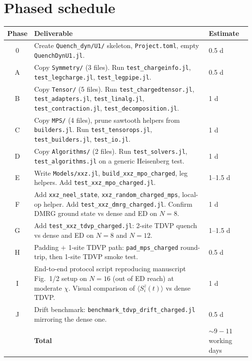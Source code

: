\documentclass[11pt]{article}
\begin{document}
\section{Phased schedule}

\begin{center}
\renewcommand{\arraystretch}{1.15}
\begin{tabularx}{\linewidth}{c X l}
\toprule
Phase & Deliverable & Estimate \\
\midrule
0 & Create \texttt{Quench\_dyn/U1/} skeleton, \texttt{Project.toml}, empty \texttt{QuenchDynU1.jl}. & 0.5 d \\
A & Copy \texttt{Symmetry/} (3 files).  Run \texttt{test\_chargeinfo.jl}, \texttt{test\_legcharge.jl}, \texttt{test\_legpipe.jl}. & 0.5 d \\
B & Copy \texttt{Tensor/} (5 files).  Run \texttt{test\_chargedtensor.jl}, \texttt{test\_adapters.jl}, \texttt{test\_linalg.jl}, \texttt{test\_contraction.jl}, \texttt{test\_decomposition.jl}. & 1 d \\
C & Copy \texttt{MPS/} (4 files), prune sawtooth helpers from \texttt{builders.jl}.  Run \texttt{test\_tensorops.jl}, \texttt{test\_builders.jl}, \texttt{test\_io.jl}. & 1 d \\
D & Copy \texttt{Algorithms/} (2 files).  Run \texttt{test\_solvers.jl}, \texttt{test\_algorithms.jl} on a generic Heisenberg test. & 1 d \\
E & Write \texttt{Models/xxz.jl}, \texttt{build\_xxz\_mpo\_charged}, leg helpers. Add \texttt{test\_xxz\_mpo\_charged.jl}. & 1--1.5 d \\
F & Add \texttt{xxz\_neel\_state}, \texttt{xxz\_random\_charged\_mps}, local-op helper.  Add \texttt{test\_xxz\_dmrg\_charged.jl}.  Confirm DMRG ground state vs dense and ED on $N=8$. & 1 d \\
G & Add \texttt{test\_xxz\_tdvp\_charged.jl}: 2-site TDVP quench vs dense and ED on $N=8$ and $N=12$. & 1--1.5 d \\
H & Padding $+$ 1-site TDVP path: \texttt{pad\_mps\_charged} round-trip, then 1-site TDVP smoke test. & 0.5 d \\
I & End-to-end protocol script reproducing manuscript Fig.~1/2 setup on $N=16$ (out of ED reach) at moderate $\chi$.  Visual comparison of $\langle S_i^z(t)\rangle$ vs dense TDVP. & 1 d \\
J & Drift benchmark: \texttt{benchmark\_tdvp\_drift\_charged.jl} mirroring the dense one. & 0.5 d \\
\midrule
& \textbf{Total} & $\sim 9\!-\!11$ working days \\
\bottomrule
\end{tabularx}
\end{center}
\end{document}
